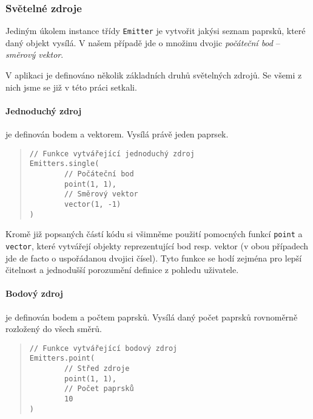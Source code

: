 \subsubsection{Světelné zdroje}

Jediným úkolem instance třídy \texttt{Emitter} je vytvořit jakýsi seznam paprsků, které daný objekt vysílá. V našem případě jde o množinu dvojic \emph{počáteční bod} -- \emph{směrový vektor}.

V aplikaci je definováno několik základních druhů světelných zdrojů. Se všemi z nich jsme se již v této práci setkali.

\paragraph{Jednoduchý zdroj} je definován bodem a vektorem. Vysílá právě jeden paprsek.

\begin{minipage}{\textwidth}\begin{quote}\begin{lstlisting}
// Funkce vytvářející jednoduchý zdroj
Emitters.single(
        // Počáteční bod
        point(1, 1),
        // Směrový vektor
        vector(1, -1)
)
\end{lstlisting}\end{quote}\end{minipage}


Kromě již popsaných částí kódu si všimněme použití pomocných funkcí \texttt{point} a \texttt{vector}, které vytvářejí objekty reprezentující bod resp. vektor (v obou případech jde de facto o uspořádanou dvojici čísel). Tyto funkce se hodí zejména pro lepší čitelnost a jednodušší porozumění definice z pohledu uživatele.

\paragraph{Bodový zdroj} je definován bodem a počtem paprsků. Vysílá daný počet paprsků rovnoměrně rozložený do všech směrů.

\begin{minipage}{\textwidth}\begin{quote}\begin{lstlisting}
// Funkce vytvářející bodový zdroj
Emitters.point(
        // Střed zdroje
        point(1, 1),
        // Počet paprsků
        10
)
\end{lstlisting}\end{quote}\end{minipage}

